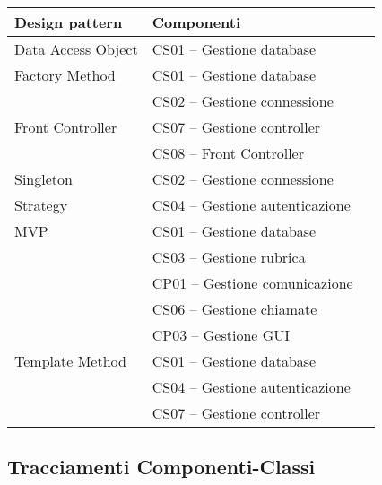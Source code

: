 \begin{center}
\begin{longtable}{lp{}l}
\toprule Design pattern & Componenti\\
\midrule
Data Access Object & CS01 -- Gestione database\\
Factory Method & CS01 -- Gestione database\\
& CS02 -- Gestione connessione\\
Front Controller & CS07 -- Gestione controller\\
& CS08 -- Front Controller \\
Singleton & CS02 -- Gestione connessione\\
Strategy & CS04 -- Gestione autenticazione\\
MVP & CS01 -- Gestione database\\
& CS03 -- Gestione rubrica\\
& CP01 -- Gestione comunicazione\\
& CS06 -- Gestione chiamate\\
& CP03 -- Gestione GUI\\
Template Method & CS01 -- Gestione database\\
& CS04 -- Gestione autenticazione\\
& CS07 -- Gestione controller\\
\bottomrule
\end{longtable}
\end{center}
\subsection{Tracciamenti Componenti-Classi}\label{sec:tracCompClass}


